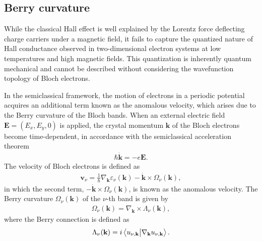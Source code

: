 \subsection{Berry curvature}
While the classical Hall effect is well explained by the Lorentz force deflecting charge carriers under a magnetic field, it fails to capture the quantized nature of Hall conductance observed in two-dimensional electron systems at low temperatures and high magnetic fields. This quantization is inherently quantum mechanical and cannot be described without considering the wavefunction topology of Bloch electrons.

In the semiclassical framework, the motion of electrons in a periodic potential acquires an additional term known as the anomalous velocity, which arises due to the Berry curvature of the Bloch bands. When an external electric field $\mathbf{E} = \left(E_{x}, E_{y}, 0\right)$ is applied, the crystal momentum $\mathbf{k}$ of the Bloch electrons become time-dependent, in accordance with the semiclassical acceleration theorem
\begin{gather}
	\hbar \dot{\mathbf{k}} = - e \mathbf{E}.
\end{gather}
The velocity of Bloch electrons is defined as
\begin{gather}
	\mathbf{v}_{\nu} = \frac{1}{\hbar} \nabla_{\mathbf{k}} \varepsilon_{\nu}(\mathbf{\mathbf{k}}) - \dot{\mathbf{k}} \times \Omega_{\nu}(\mathbf{k}),
\end{gather}
in which the second term, $ - \dot{\mathbf{k}} \times \Omega_{\nu}(\mathbf{k}) $, is known as the anomalous velocity. The Berry curvature $ \Omega_{\nu}(\mathbf{k}) $ of the $\nu$-th band is given by
\begin{gather}
	\Omega_{\nu}(\mathbf{k}) = \nabla_{\mathbf{k}} \times \Lambda_{\nu}(\mathbf{k}),
\end{gather}
where the Berry connection is defined as
\begin{gather}
	\Lambda_{\nu}(\mathbf{k}) = i \braket{u_{\nu,\mathbf{k}}}{\nabla_{\mathbf{k}} u_{\nu,\mathbf{k}}}.
\end{gather}

